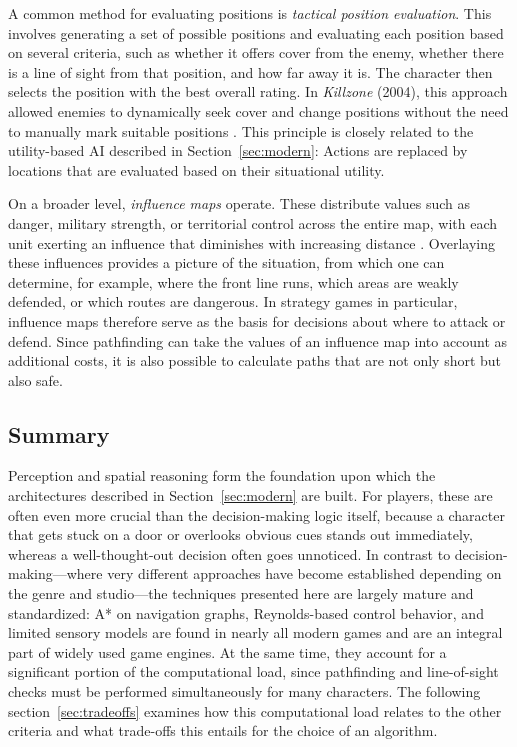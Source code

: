 A common method for evaluating positions is \emph{tactical position evaluation}. This involves generating a set of possible positions and evaluating each position based on several criteria, such as whether it offers cover from the enemy, whether there is a line of sight from that position, and how far away it is. The character then selects the position with the best overall rating. In \emph{Killzone} (2004), this approach allowed enemies to dynamically seek cover and change positions without the need to manually mark suitable positions \cite{straatman2005}. This principle is closely related to the utility-based AI described in Section~\ref{sec:modern}: Actions are replaced by locations that are evaluated based on their situational utility.


On a broader level, \emph{influence maps} operate. These distribute values such as danger, military strength, or territorial control across the entire map, with each unit exerting an influence that diminishes with increasing distance \cite{tozour2001,millington2009}. Overlaying these influences provides a picture of the situation, from which one can determine, for example, where the front line runs, which areas are weakly defended, or which routes are dangerous. In strategy games in particular, influence maps therefore serve as the basis for decisions about where to attack or defend. Since pathfinding can take the values of an influence map into account as additional costs, it is also possible to calculate paths that are not only short but also safe.

\subsection{Summary}

Perception and spatial reasoning form the foundation upon which the architectures described in Section~\ref{sec:modern} are built. For players, these are often even more crucial than the decision-making logic itself, because a character that gets stuck on a door or overlooks obvious cues stands out immediately, whereas a well-thought-out decision often goes unnoticed. In contrast to decision-making—where very different approaches have become established depending on the genre and studio—the techniques presented here are largely mature and standardized: A* on navigation graphs, Reynolds-based control behavior, and limited sensory models are found in nearly all modern games and are an integral part of widely used game engines. At the same time, they account for a significant portion of the computational load, since pathfinding and line-of-sight checks must be performed simultaneously for many characters. The following section~\ref{sec:tradeoffs} examines how this computational load relates to the other criteria and what trade-offs this entails for the choice of an algorithm.
